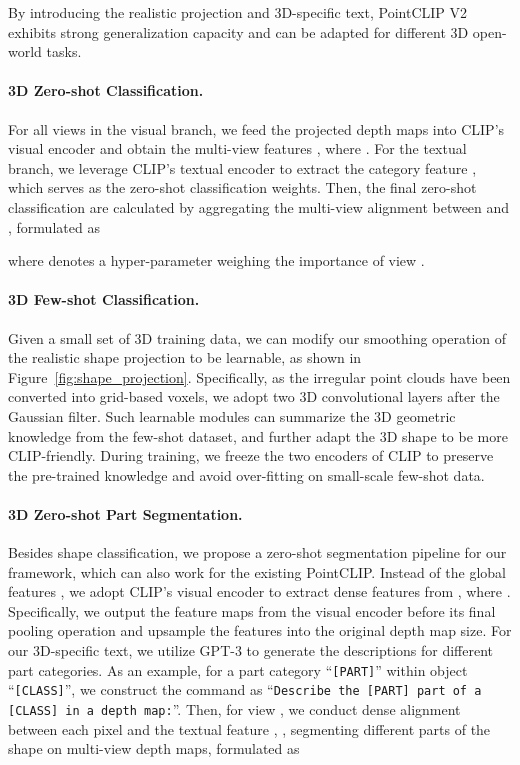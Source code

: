 \documentclass[10pt,twocolumn,letterpaper]{article}
\begin{document}
By introducing the realistic projection and 3D-specific text, PointCLIP V2 exhibits strong generalization capacity and can be adapted for different 3D open-world tasks.

\paragraph{3D Zero-shot Classification.}
For all  views in the visual branch, we feed the projected depth maps  into CLIP's visual encoder and obtain the multi-view features , where .
For the textual branch, we leverage CLIP's textual encoder to extract the category feature , which serves as the zero-shot classification weights.
Then, the final zero-shot classification  are calculated by aggregating the multi-view alignment between  and , formulated as

where  denotes a hyper-parameter weighing the importance of view . 

\paragraph{3D Few-shot Classification.}
Given a small set of 3D training data, we can modify our smoothing operation of the realistic shape projection to be learnable, as shown in Figure~\ref{fig:shape_projection}. Specifically, as the irregular point clouds have been converted into grid-based voxels, we adopt two 3D convolutional layers after the Gaussian filter. Such learnable modules can summarize the 3D geometric knowledge from the few-shot dataset, and further adapt the 3D shape to be more CLIP-friendly. During training, we freeze the two encoders of CLIP to preserve the pre-trained knowledge and avoid over-fitting on small-scale few-shot data.

\paragraph{3D Zero-shot Part Segmentation.}
Besides shape classification, we propose a zero-shot segmentation pipeline for our framework, which can also work for the existing PointCLIP. Instead of the global features , we adopt CLIP's visual encoder to extract dense features  from , where . Specifically, we output the feature maps from the visual encoder before its final pooling operation and upsample the features into the original depth map size. 
For our 3D-specific text, we utilize GPT-3 to generate the descriptions for different part categories. As an example, for a part category ``\texttt{[PART]}'' within object ``\texttt{[CLASS]}'', we construct the command as ``\texttt{Describe the {[PART]} part of a {[CLASS]} in a depth map:}''.
Then, for view , we conduct dense alignment between each pixel and the textual feature , \ie, segmenting different parts of the shape on multi-view depth maps, formulated as
\end{document}
